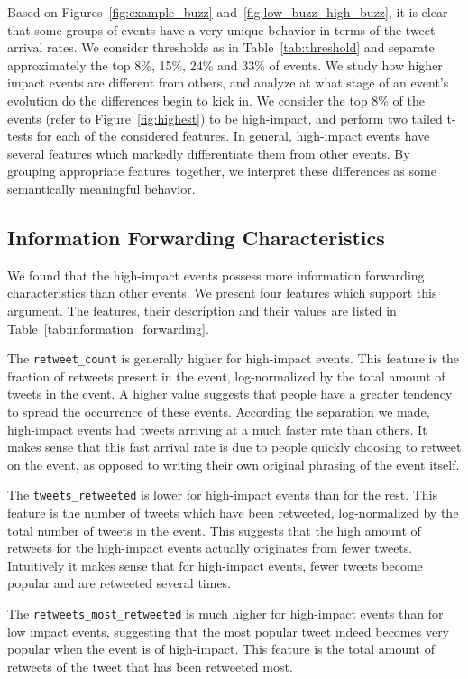 \documentclass[10pt,letterpaper]{article}
\begin{document}
Based on Figures~\ref{fig:example_buzz}
and~\ref{fig:low_buzz_high_buzz}, it is clear that some groups of
events have a very unique behavior in terms of the tweet arrival
rates. We consider thresholds as in Table~\ref{tab:threshold} and
separate approximately the top 8\%, 15\%, 24\% and 33\% of events. We
study how higher impact events are different from others, and analyze
at what stage of an event's evolution do the differences begin to kick
in. We consider the top 8\% of the events (refer to
Figure~\ref{fig:highest}) to be high-impact, and perform two tailed
t-tests for each of the considered features. In general, high-impact
events have several features which markedly differentiate them from
other events. By grouping appropriate features together, we interpret
these differences as some semantically meaningful behavior.

\subsection{Information Forwarding Characteristics}
\label{subsec:info_forwarding}
We found that the high-impact events possess more information
forwarding characteristics than other events. We present four features
which support this argument. The features, their description and their
values are listed in Table~\ref{tab:information_forwarding}.


The \texttt{retweet\_count} is generally higher for high-impact
events. This feature is the fraction of retweets present in the event,
log-normalized by the total amount of tweets in the event. A higher
value suggests that people have a greater tendency to spread the
occurrence of these events. According the separation we made,
high-impact events had tweets arriving at a much faster rate than
others. It makes sense that this fast arrival rate is due to people
quickly choosing to retweet on the event, as opposed to writing their
own original phrasing of the event itself.

The \texttt{tweets\_retweeted} is lower for high-impact events than
for the rest. This feature is the number of tweets which have been
retweeted, log-normalized by the total number of tweets in the event.
This suggests that the high amount of retweets for the high-impact
events actually originates from fewer tweets. Intuitively it makes
sense that for high-impact events, fewer tweets become popular and are
retweeted several times.

The \texttt{retweets\_most\_retweeted} is much higher for high-impact
events than for low impact events, suggesting that the most popular
tweet indeed becomes very popular when the event is of high-impact.
This feature is the total amount of retweets of the tweet that has
been retweeted most.
\end{document}
